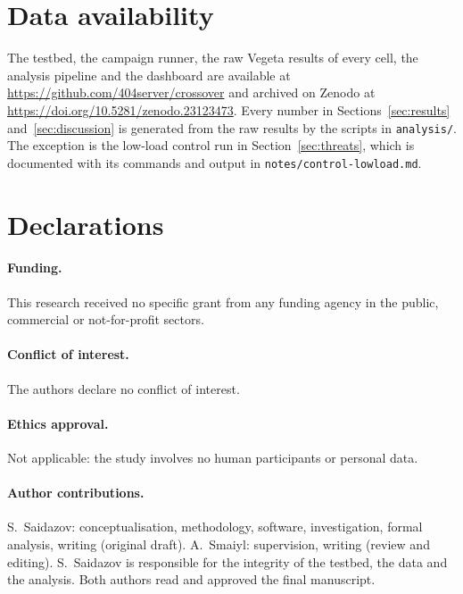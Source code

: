 









\section*{Data availability}
The testbed, the campaign runner, the raw Vegeta results of every cell, the analysis pipeline and the
dashboard are available at \url{https://github.com/404server/crossover} and archived on Zenodo at
\url{https://doi.org/10.5281/zenodo.23123473}.
Every number in Sections~\ref{sec:results} and~\ref{sec:discussion} is generated from the raw results by the
scripts in \texttt{analysis/}. The exception is the low-load control run in Section~\ref{sec:threats}, which is
documented with its commands and output in \texttt{notes/control-lowload.md}.

\section*{Declarations}
\paragraph{Funding.} This research received no specific grant from any funding agency in the public, commercial
or not-for-profit sectors.
\paragraph{Conflict of interest.} The authors declare no conflict of interest.
\paragraph{Ethics approval.} Not applicable: the study involves no human participants or personal data.
\paragraph{Author contributions.} S.~Saidazov: conceptualisation, methodology, software, investigation, formal
analysis, writing (original draft). A.~Smaiyl: supervision, writing (review and editing). S.~Saidazov is responsible for
the integrity of the testbed, the data and the analysis. Both authors read and approved the final manuscript.





